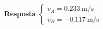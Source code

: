 
\textbf{Resposta}
$
\begin{cases}
	v_{A}=\SI{0.233}{\meter/\second}\\
	v_{B}=\SI{-0.117}{\meter/\second}
\end{cases}
$